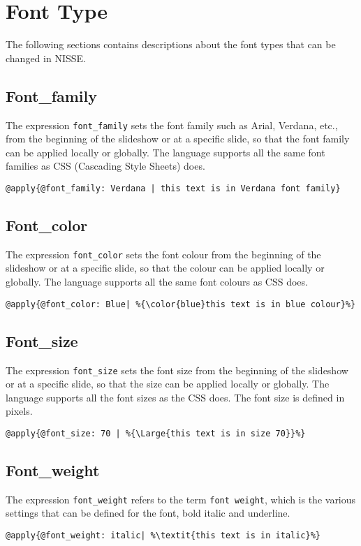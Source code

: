 \section{Font Type}
\label{AppendixFontType}
The following sections contains descriptions about the font types that can be changed in NISSE.

\subsection{Font\_family}
The expression \texttt{font\_family} sets the font family such as Arial, Verdana, etc., from the beginning of the slideshow or at a specific slide, so that the font family can be applied locally or globally. The language supports all the same font families as CSS (Cascading Style Sheets) does.

\begin{lstlisting}[frame=single]
	@apply{@font_family: Verdana | this text is in Verdana font family}
\end{lstlisting}

\subsection{Font\_color}
The expression \texttt{font\_color} sets the font colour from the beginning of the slideshow or at a specific slide, so that the colour can be applied locally or globally. The language supports all the same font colours as CSS does.

\begin{lstlisting}[frame=single]
	@apply{@font_color: Blue| %{\color{blue}this text is in blue colour}%}
\end{lstlisting}

\subsection{Font\_size}
The expression \texttt{font\_size} sets the font size from the beginning of the slideshow or at a specific slide, so that the size can be applied locally or globally. The language supports all the font sizes as the CSS does. The font size is defined in pixels.

\begin{lstlisting}[frame=single]
	@apply{@font_size: 70 | %{\Large{this text is in size 70}}%}
\end{lstlisting}

\subsection{Font\_weight}
The expression \texttt{font\_weight} refers to the term \texttt{font weight}, which is the various settings that can be defined for the font, bold italic and underline.

\begin{lstlisting}[frame=single]
	@apply{@font_weight: italic| %\textit{this text is in italic}%}
\end{lstlisting}